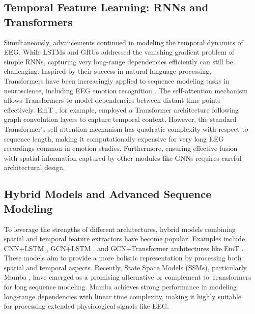 \documentclass[runningheads]{llncs}
\begin{document}
\subsection{Temporal Feature Learning: RNNs and Transformers}
Simultaneously, advancements continued in modeling the temporal dynamics of EEG. While LSTMs and GRUs addressed the vanishing gradient problem of simple RNNs, capturing very long-range dependencies efficiently can still be challenging. Inspired by their success in natural language processing, Transformers \cite{cite_vaswani_attention} have been increasingly applied to sequence modeling tasks in neuroscience, including EEG emotion recognition \cite{cite_transformer_eeg_1, cite_transformer_eeg_2}. The self-attention mechanism allows Transformers to model dependencies between distant time points effectively. EmT \cite{cite_ding_emt}, for example, employed a Transformer architecture following graph convolution layers to capture temporal context. However, the standard Transformer's self-attention mechanism has quadratic complexity with respect to sequence length, making it computationally expensive for very long EEG recordings common in emotion studies. Furthermore, ensuring effective fusion with spatial information captured by other modules like GNNs requires careful architectural design.

\subsection{Hybrid Models and Advanced Sequence Modeling}
To leverage the strengths of different architectures, hybrid models combining spatial and temporal feature extractors have become popular. Examples include CNN+LSTM \cite{cite_cnn_lstm}, GCN+LSTM \cite{cite_gcn_lstm}, and GCN+Transformer architectures like EmT \cite{cite_ding_emt}. These models aim to provide a more holistic representation by processing both spatial and temporal aspects. Recently, State Space Models (SSMs), particularly Mamba \cite{cite_mamba}, have emerged as a promising alternative or complement to Transformers for long sequence modeling. Mamba achieves strong performance in modeling long-range dependencies with linear time complexity, making it highly suitable for processing extended physiological signals like EEG.
\end{document}
